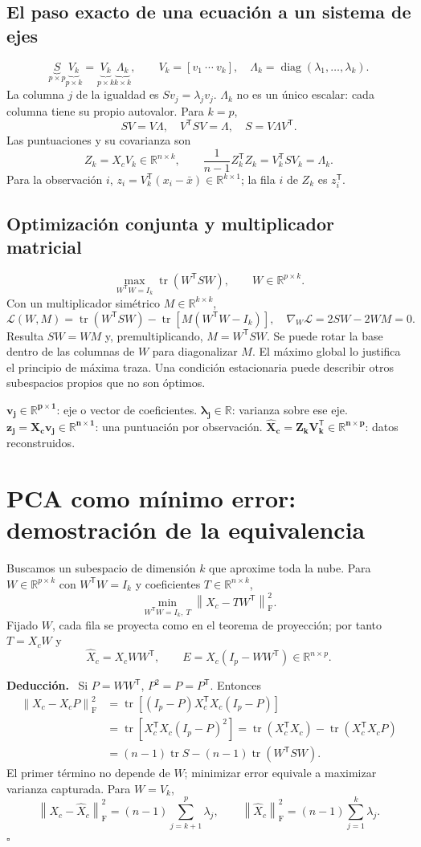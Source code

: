 \documentclass[11pt,a4paper]{article}
\newcommand{\R}{\mathbb R}
\newcommand{\T}{^{\mathsf T}}
\newcommand{\norm}[1]{\left\lVert #1\right\rVert}
\DeclareMathOperator{\tr}{tr}
\newenvironment{deduccion}{\par\textbf{Deducción.}\ }{\hfill$\square$\par}
\DeclareMathOperator{\diag}{diag}
\newcommand{\F}{_{\mathrm F}}
\theoremstyle{definition}
\begin{document}
\subsection{El paso exacto de una ecuación a un sistema de ejes}
\[
\underbrace{S}_{p\times p}\underbrace{V_k}_{p\times k}
=\underbrace{V_k}_{p\times k}\underbrace{\Lambda_k}_{k\times k},\qquad
V_k=[v_1\ \cdots\ v_k],\quad\Lambda_k=\diag(\lambda_1,\ldots,\lambda_k).
\]
La columna $j$ de la igualdad es $Sv_j=\lambda_jv_j$. $\Lambda_k$ no es un único escalar: cada columna tiene su propio autovalor. Para $k=p$,
\[
SV=V\Lambda,\quad V\T SV=\Lambda,\quad S=V\Lambda V\T.
\]
Las puntuaciones y su covarianza son
\[
\boxed{Z_k=X_cV_k\in\R^{n\times k}},\qquad
\frac1{n-1}Z_k\T Z_k=V_k\T SV_k=\Lambda_k.
\]
Para la observación $i$, $z_i=V_k\T(x_i-\bar x)\in\R^{k\times1}$; la fila $i$ de $Z_k$ es $z_i\T$.
\subsection{Optimización conjunta y multiplicador matricial}
\[
\max_{W\T W=I_k}\tr(W\T SW),\qquad W\in\R^{p\times k}.
\]
Con un multiplicador simétrico $M\in\R^{k\times k}$,
\[
\mathcal L(W,M)=\tr(W\T SW)-\tr[M(W\T W-I_k)],\quad
\nabla_W\mathcal L=2SW-2WM=0.
\]
Resulta $SW=WM$ y, premultiplicando, $M=W\T SW$. Se puede rotar la base dentro de las columnas de $W$ para diagonalizar $M$. El máximo global lo justifica el principio de máxima traza. Una condición estacionaria puede describir otros subespacios propios que no son óptimos.
\begin{idea}
$\boldsymbol{v_j\in\R^{p\times1}}$: eje o vector de coeficientes.\quad
$\boldsymbol{\lambda_j\in\R}$: varianza sobre ese eje.\\
$\boldsymbol{z_j=X_cv_j\in\R^{n\times1}}$: una puntuación por observación.\quad
$\boldsymbol{\widehat X_c=Z_kV_k\T\in\R^{n\times p}}$: datos reconstruidos.
\end{idea}

\section{PCA como mínimo error: demostración de la equivalencia}
Buscamos un subespacio de dimensión $k$ que aproxime toda la nube. Para $W\in\R^{p\times k}$ con $W\T W=I_k$ y coeficientes $T\in\R^{n\times k}$,
\[
\min_{W\T W=I_k,\ T}\norm{X_c-TW\T}\F^2.
\]
Fijado $W$, cada fila se proyecta como en el teorema de proyección; por tanto $T=X_cW$ y
\[
\widehat X_c=X_cWW\T,\qquad E=X_c(I_p-WW\T)\in\R^{n\times p}.
\]
\begin{deduccion}
Si $P=WW\T$, $P^2=P=P\T$. Entonces
\begin{align*}
\norm{X_c-X_cP}\F^2
&=\tr[(I_p-P)X_c\T X_c(I_p-P)]\\
&=\tr[X_c\T X_c(I_p-P)^2]
=\tr(X_c\T X_c)-\tr(X_c\T X_cP)\\
&=(n-1)\tr S-(n-1)\tr(W\T SW).
\end{align*}
El primer término no depende de $W$; minimizar error equivale a maximizar varianza capturada. Para $W=V_k$,
\[
\boxed{\norm{X_c-\widehat X_c}\F^2=(n-1)\sum_{j=k+1}^p\lambda_j},\qquad
\boxed{\norm{\widehat X_c}\F^2=(n-1)\sum_{j=1}^k\lambda_j}.
\]
\end{deduccion}
\end{document}
